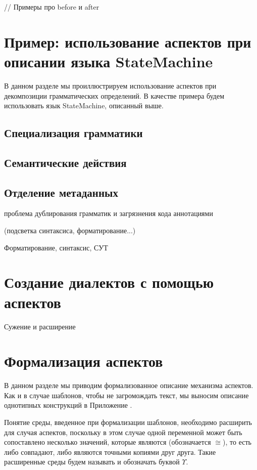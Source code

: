 // Примеры про before и after

\section{Пример: использование аспектов при описании языка StateMachine}

В данном разделе мы проиллюстрируем использование аспектов при декомпозиции грамматических определений. В качестве примера будем использовать язык StateMachine, описанный выше.

\subsection{Специализация грамматики}

\subsection{Семантические действия}

\subsection{Отделение метаданных}

проблема дублирования грамматик и загрязнения кода аннотациями

(подсветка синтаксиса, форматирование...)

Форматирование, синтаксис, СУТ

\section{Создание диалектов с помощью аспектов}

Сужение и расширение

\section{Формализация аспектов}

В данном разделе мы приводим формализованное описание механизма аспектов. Как и в случае шаблонов, чтобы не загромождать текст, мы выносим описание однотипных конструкций в Приложение .

\newcommand{\ME}{\Upsilon}
\newcommand{\meitem}[2]{\left\{ #1 \mapsto #2 \right\}}
\newcommand{\meempty}{\left\{\right\}}
\newcommand{\mejoin}{\uplus}

Понятие среды, введенное при формализации шаблонов, необходимо расширить для случая аспектов, поскольку в этом случае одной переменной может быть сопоставлено несколько значений, которые являются  (обозначается $\cong$), то есть либо совпадают, либо являются точными копиями друг друга. Такие расширенные среды будем называть  и обозначать буквой $\ME$.

